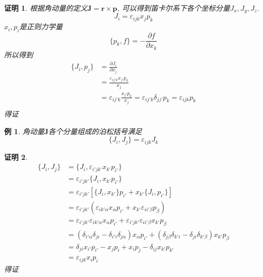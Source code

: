 \documentclass[a4paper,11pt]{article}
\theoremstyle{mystyle}
\newtheorem{Proof}{\hspace{2em}证明}[section]
\newtheorem{example}{\hspace{2em}例}[section]
\begin{document}
\begin{Proof}
  根据角动量的定义$\mathbf{J}=\mathbf{r}\times\mathbf{p}$, 可以得到笛卡尔系下各个坐标分量$J_x,J_y,J_z$.
\begin{equation*}
  J_i=\varepsilon_{ijk}x_jp_k
\end{equation*}
$x_i,p_i$是正则力学量
\begin{equation*}
  \{p_k,f\}=-\frac{\partial f}{\partial{x_k}}
\end{equation*}
所以得到
\begin{equation*}
  \begin{split}
     \{J_i,p_j\}&=\frac{\partial J_i}{\partial{x_j}} \\
       &=\frac{\varepsilon_{ij'k}x_{j'}p_k}{x_j} \\
       &=\varepsilon_{ij'k}\frac{x_{j'}p_k}{x_j}=\varepsilon_{ij'k}\delta_{jj'}p_k=\varepsilon_{ijk}p_k \\
  \end{split}
\end{equation*}
得证
\end{Proof}
\begin{example}
  角动量$\mathbf{J}$各个分量组成的泊松括号满足
\begin{equation*}
  \{J_i,J_j\}=\varepsilon_{ijk}J_k
\end{equation*}
\end{example}
\begin{Proof}
\begin{equation*}
  \begin{split}
     \{J_i,J_j\}&=\{J_i,\varepsilon_{i'jk'}x_{k'}p_{i'}\} \\
       &=\varepsilon_{i'jk'}\{J_i,x_{k'}p_{i'}\} \\
       &=\varepsilon_{i'jk'}\left[\{J_{i},x_{k'}\}p_{i'}+x_{k'}\{J_i,p_{i'}\}\right] \\
       &=\varepsilon_{i'jk'}\left(\varepsilon_{ik'\alpha}x_\alpha p_{i'}+x_{k'}\varepsilon_{ii'\beta}p_\beta\right) \\
       &=\varepsilon_{i'jk'}\varepsilon_{ik'\alpha}x_\alpha p_{i'}+\varepsilon_{i'jk'}\varepsilon_{ii'\beta}x_{k'}p_\beta \\
       &=\left(\delta_{i'\alpha}\delta_{ji}-\delta_{i'i}\delta_{j\alpha}\right)x_\alpha p_{i'}+\left(\delta_{j\beta}\delta_{k'i}-\delta_{ji}\delta_{k'\beta}\right)x_{k'}p_\beta \\
       &=\delta_{ji}x_{i'}p_{i'}-x_jp_i+x_ip_j-\delta_{ij}x_{k'}p_{k'} \\
       &=\varepsilon_{ijk}x_ip_i
  \end{split}
\end{equation*}
得证
\end{Proof}
\end{document}
